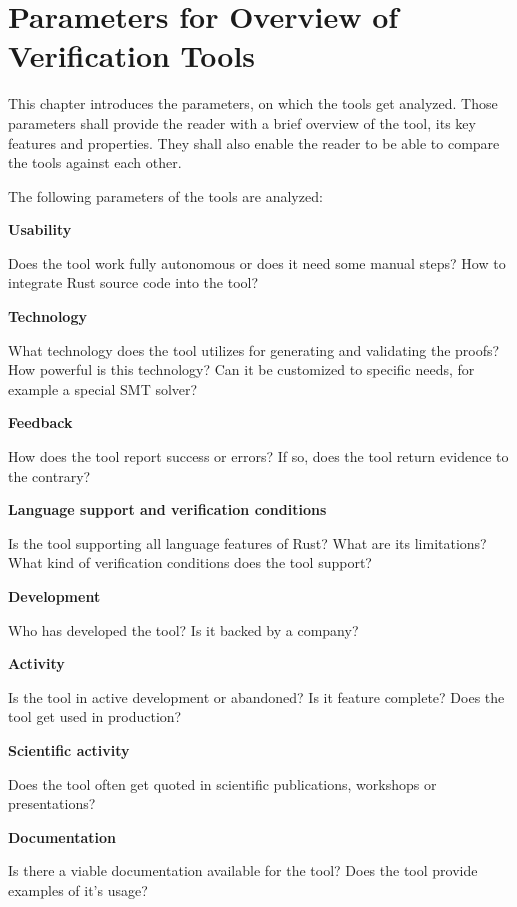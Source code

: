 \section{Parameters for Overview of Verification Tools}
\label{parameters}

This chapter introduces the parameters, on which the tools get analyzed. Those parameters shall provide the reader with a brief overview of the tool, its key features and properties. They shall also enable the reader to be able to compare the tools against each other.

The following parameters of the tools are analyzed:

\textbf{Usability}

Does the tool work fully autonomous or does it need some manual steps? How to integrate Rust source code into the tool?

\textbf{Technology}

What technology does the tool utilizes for generating and validating the proofs? How powerful is this technology? Can it be customized to specific needs, for example a special SMT solver?

\textbf{Feedback}

How does the tool report success or errors? If so, does the tool return evidence to the contrary?

\textbf{Language support and verification conditions}

Is the tool supporting all language features of Rust? What are its limitations? What kind of verification conditions does the tool support?

\textbf{Development}

Who has developed the tool? Is it backed by a company?

\textbf{Activity}

Is the tool in active development or abandoned? Is it feature complete? Does the tool get used in production?

\textbf{Scientific activity}

Does the tool often get quoted in scientific publications, workshops or presentations?

\textbf{Documentation}

Is there a viable documentation available for the tool? Does the tool provide examples of it's usage?